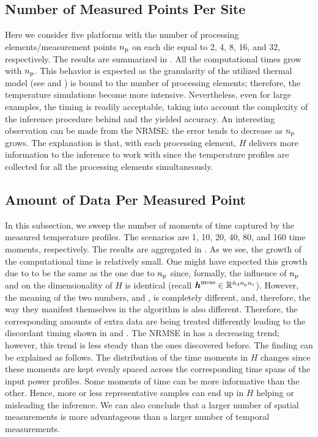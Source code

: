 \subsection{Number of Measured Points Per Site}

Here we consider five platforms with the number of processing
elements/measurement points ${n_\mathrm{p}}$ on each die equal to 2, 4, 8, 16, and 32,
respectively. The results are summarized in . All the
computational times grow with ${n_\mathrm{p}}$. This behavior is expected as the
granularity of the utilized thermal model (see  and
\cite{ukhov2012}) is bound to the number of processing elements; therefore, the
temperature simulations become more intensive. Nevertheless, even for large
examples, the timing is readily acceptable, taking into account the complexity
of the inference procedure behind and the yielded accuracy. An interesting
observation can be made from the NRMSE: the error tends to decrease as ${n_\mathrm{p}}$
grows. The explanation is that, with each processing element, $H$ delivers
more information to the inference to work with since the temperature profiles
are collected for all the processing elements simultaneously.

\subsection{Amount of Data Per Measured Point}

In this subsection, we sweep the number of moments of time \ns captured by the
measured temperature profiles. The scenarios are 1, 10, 20, 40, 80, and 160 time
moments, respectively. The results are aggregated in
. As we see, the growth of the computational time is
relatively small. One might have expected this growth due to \ns to be the same
as the one due to ${n_\mathrm{p}}$ since, formally, the influence of ${n_\mathrm{p}}$ and \ns on the
dimensionality of $H$ is identical (recall $\boldsymbol{h}^{\mathrm{meas}} \in \mathbb{R}^{{\hat{n}_\mathrm{d}} {n_\mathrm{p}}
{n_\mathrm{s}}}$). However, the meaning of the two numbers, \np and \ns, is completely
different, and, therefore, the way they manifest themselves in the algorithm is
also different. Therefore, the corresponding amounts of extra data are being
treated differently leading to the discordant timing shown in
 and . The NRMSE in
 has a decreasing trend; however, this trend is less
steady than the ones discovered before. The finding can be explained as follows.
The distribution of the time moments in $H$ changes since these moments are kept
evenly spaced across the corresponding time spans of the input power profiles.
Some moments of time can be more informative than the other. Hence, more or less
representative samples can end up in $H$ helping or misleading the inference. We
can also conclude that a larger number of spatial measurements is more
advantageous than a larger number of temporal measurements.

